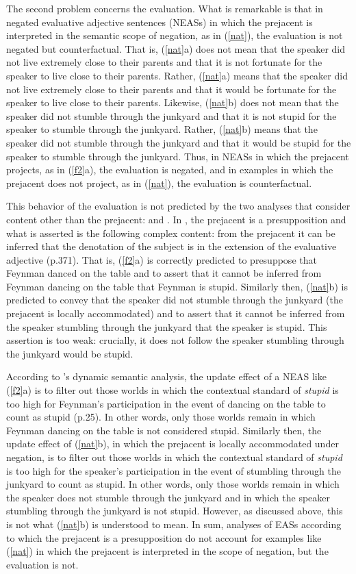 \documentclass[11pt,fleqn]{article}
\newcommand{\6}{\mbox{$[\hspace*{-.6mm}[$}}
\newcommand{\9}{\mbox{$]\hspace*{-.6mm}]$}}
\newcommand{\citepos}[1]{\citeauthor{#1}'s \citeyear{#1}}
\begin{document}
The second problem concerns the evaluation. What is remarkable is that in negated evaluative adjective sentences (NEASs) in which the prejacent is interpreted in the semantic scope of negation, as in (\ref{nat}), the evaluation is not negated but counterfactual. That is, (\ref{nat}a) does not mean that the speaker did not live extremely close to their parents and that it is not fortunate for the speaker to live close to their parents. Rather, (\ref{nat}a) means that the speaker did not live extremely close to their parents and that it would be fortunate for the speaker to live close to their parents. Likewise, (\ref{nat}b) does not mean that the speaker did not stumble through the junkyard and that it is not stupid for the speaker to stumble through the junkyard. Rather, (\ref{nat}b) means that the speaker did not stumble through the junkyard and that it would be stupid for the speaker to stumble through the junkyard. Thus, in NEASs in which the prejacent projects, as in (\ref{f2}a), the evaluation is negated, and in examples in which the prejacent does not project, as in (\ref{nat}), the evaluation is counterfactual. 

This behavior of the evaluation is not predicted by the two analyses that consider content other than the prejacent: \citealt{oshima09b} and \citealt{barker02}. In \citealt{oshima09b}, the prejacent is a presupposition and what is asserted is the following complex content: from the prejacent it can be inferred that the denotation of the subject is in the extension of the evaluative adjective (p.371). That is, (\ref{f2}a) is correctly predicted to presuppose that Feynman danced on the table and to assert that it cannot be inferred from Feynman dancing on the table that Feynman is stupid. Similarly then, (\ref{nat}b) is predicted to convey that the speaker did not stumble through the junkyard (the prejacent is locally accommodated) and to assert that it cannot be inferred from the speaker stumbling through the junkyard that the speaker is stupid. This assertion is too weak: crucially, it does not follow the speaker stumbling through the junkyard would be stupid. 

According to \citepos{barker02} dynamic semantic analysis, the update effect of a NEAS like (\ref{f2}a) is to filter out those worlds in which the contextual standard of {\em stupid} is too high for Feynman's participation in the event of dancing on the table to count as stupid (p.25). In other words, only those worlds remain in which Feynman dancing on the table is not considered stupid. Similarly then, the update effect of (\ref{nat}b), in which the prejacent is locally accommodated under negation, is to filter out those worlds in which the contextual standard of {\em stupid} is too high for the speaker's participation in the event of stumbling through the junkyard to count as stupid. In other words, only those worlds remain in which the speaker does not stumble through the junkyard and in which the speaker stumbling through the junkyard is not stupid. However, as discussed above, this is not what (\ref{nat}b) is understood to mean. In sum, analyses of EASs according to which the prejacent is a presupposition do not account for examples like (\ref{nat}) in which the prejacent is interpreted in the scope of negation, but the evaluation is not. 
\end{document}
